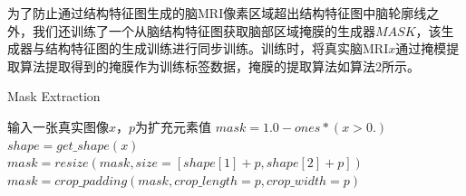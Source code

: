 \documentclass[letterpaper]{article} %
\begin{document}
为了防止通过结构特征图生成的脑MRI像素区域超出结构特征图中脑轮廓线之外，我们还训练了一个从脑结构特征图获取脑部区域掩膜的生成器$MASK$，该生成器与结构特征图的生成训练进行同步训练。训练时，将真实脑MRI$x$通过掩模提取算法提取得到的掩膜作为训练标签数据，掩膜的提取算法如算法2所示。
\begin{algorithm}
	\caption{Mask Extraction}
	\label{alg:2}
	\begin{algorithmic}[1]
		\State 输入一张真实图像$x$，$p$为扩充元素值
		\State $mask = 1.0 - ones * (x > 0.)$
		\State $shape = get\_shape(x)$
		\State $mask = resize(mask, size=[shape[1] + p, shape[2] + p])$
		\State $mask = crop\_padding(mask, crop\_length=p, crop\_width=p)$
	\end{algorithmic}  
\end{algorithm}
\end{document}
